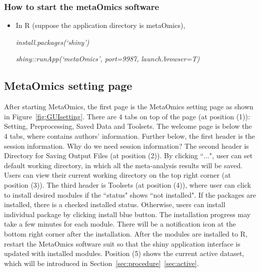 \subsubsection{How to start the metaOmics software}
\begin{itemize}
\item In R (suppose the application directory is metaOmics),

\textit{install.packages(`shiny')}

\textit{shiny::runApp(`metaOmics', port=9987, launch.browser=T)}
\end{itemize}

\subsection{MetaOmics setting page}
\label{sec:setting}
After starting MetaOmics, 
the first page is the MetaOmics setting page as shown in Figure~\ref{fig:GUIsetting}.  
There are 4 tabs on top of the page (at position {\color{red} (1)}): Setting, Preprocessing, Saved Data and Toolsets.
The welcome page is below the 4 tabs, where contains authors' information.
Further below, the first header is the session information.
{
\color{blue}
Why do we need session information?
}
The second header is Directory for Saving Output Files (at position {\color{red} (2)}).
By clicking ``$\ldots$",
user can set default working directory, in which all the meta-analysis results will be saved.
Users can view their current working directory on the top right corner (at position {\color{red} (3)}).
The third header is Toolsets (at position {\color{red} (4)}),
where user can click to install desired modules if the ``status" shows ``not installed".
If the packages are installed, there is a checked installed status.
Otherwise, users can install individual package by clicking install blue button.
The installation progress may take a few minutes for each module.
There will be a notification icon at the bottom right corner after the installation. 
After the modules are installed to R, restart the MetaOmics software suit so that the shiny application interface is updated with installed modules.
Position {\color{red} (5)} shows the current active dataset, which will be introduced in Section~\ref{sec:procedure}~\ref{sec:active}. 
 
